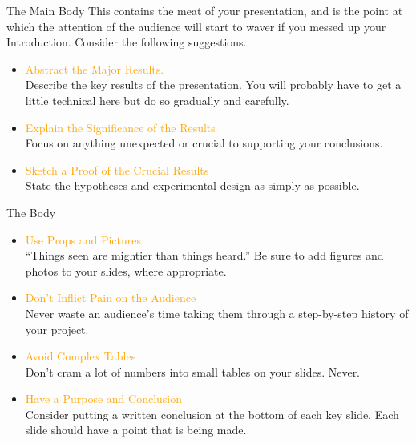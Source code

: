 \documentclass[
 size=14pt,
 paper=smartboard,  %
 mode=present, 		%
 display=slides, 	%
 style=tuliplab,  	%
 pauseslide,
 fleqn,leqno]{powerdot}
\begin{document}
\begin{slide}{The Main Body}
This contains the meat of your presentation,
and is the point at which the attention of
the audience will start to waver
if you messed up your Introduction.
Consider the following suggestions.
\begin{itemize}
  \item \textcolor{orange}{Abstract the Major Results.}\\
  Describe the key results of the presentation.
  You will probably have to get a little technical
  here but do so gradually and carefully.

  \item  \textcolor{orange}{Explain the Significance of the Results}\\
  Focus on anything unexpected or crucial to supporting your conclusions.

  \item  \textcolor{orange}{Sketch a Proof of the Crucial Results}\\
   State the hypotheses and experimental design
   as simply as possible.
\end{itemize}
\end{slide}

\begin{slide}[toc=,bm=]{The Body}
\begin{itemize}
  \item \textcolor{orange}{Use Props and Pictures}\\
  ``Things seen are mightier than things heard.''
  Be sure to add figures and photos to your slides,
  where appropriate.

  \item \textcolor{orange}{Don't Inflict Pain on the Audience}\\
  Never waste an audience's time taking them
  through a step-by-step history of your project.

  \item \textcolor{orange}{Avoid Complex Tables}\\
  Don't cram a lot of numbers
  into small tables on your slides. Never.

  \item \textcolor{orange}{Have a Purpose and Conclusion}\\
  Consider putting a written conclusion at
  the bottom of each key slide.
  Each slide should have a point that is being made.
  \end{itemize}
\end{slide}
\end{document}
